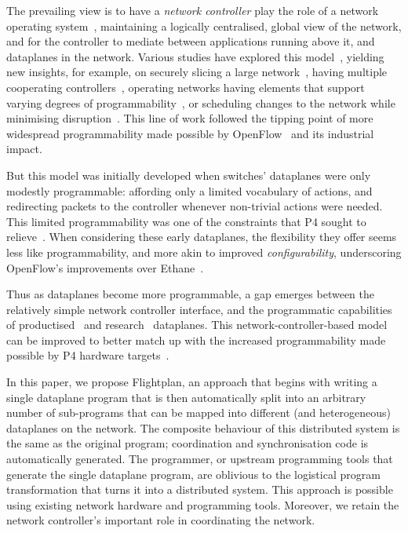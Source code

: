 \documentclass[letterpaper,twocolumn,10pt]{article}
\begin{document}
The prevailing view is to have a \emph{network controller} play the role of a
network operating system~\cite{nox,pox}, maintaining a logically
centralised, global view of the network, and for the controller to mediate
between applications running above it, and dataplanes in the network.
Various studies have explored this
model~\cite{Voellmy:2013:MSS:2534169.2486030,voellmy2011nettle,onix},
yielding new insights, for example, on securely slicing a
large network~\cite{Casado:2006:SPA:1267336.1267346}, having multiple
cooperating controllers~\cite{Jin:2015:CCH:2789770.2789777}, operating networks
having elements that support varying degrees of
programmability~\cite{Jin:2015:TCL:2774993.2775013}, or scheduling changes to the
network while minimising disruption~\cite{Vissicchio:2017:SUH:3148626.3148643}.
This line of work followed the tipping point of more widespread programmability
made possible by OpenFlow~\cite{openflow-paper} and its industrial impact.

But this model was initially developed when switches' dataplanes were only
modestly programmable: affording only a limited vocabulary of actions, and
redirecting packets to the controller whenever non-trivial actions were needed. This limited programmability was one of
the constraints that P4 sought to relieve~\cite{p4}.
When considering these early dataplanes, the flexibility they offer seems less
like programmability, and more akin to improved \emph{configurability}, underscoring
OpenFlow's improvements over Ethane~\cite{ethane-sigcomm07}.

Thus as dataplanes become more programmable, a gap emerges between the
relatively simple network controller interface, and the programmatic capabilities of
productised~\cite{tofino,trident3} and
research~\cite{Sivaraman:2016:PTH:2934872.2934900,Chole:2017:DDP:3098822.3098823}
dataplanes.
This network-controller-based model can be improved to better match up
with the increased programmability made possible by P4 hardware
targets~\cite{Bosshart:2013:FMF:2534169.2486011}.

In this paper, we propose Flightplan, an approach that begins with
writing a single dataplane program that is then automatically split
into an arbitrary number of sub-programs that can be mapped into
different (and heterogeneous) dataplanes on the network.  The
composite behaviour of this distributed system is the same as the
original program; coordination and synchronisation code is
automatically generated. The programmer, or upstream programming tools
that generate the single dataplane program, are oblivious to the
logistical program transformation that turns it into a distributed
system.  This approach is possible using existing network hardware and
programming tools. Moreover, we retain the network controller's
important role in coordinating the network.
\end{document}
